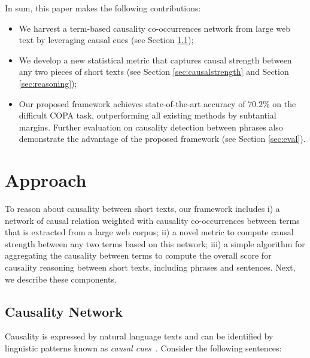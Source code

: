 \documentclass[letterpaper]{article}
\newcommand{\secref}[1]{Section \ref{#1}}
\begin{document}
In sum, this paper makes the following contributions:
\begin{itemize}
\item We harvest a term-based causality co-occurrences network from large
web text by leveraging causal cues (see \secref{sec:network});
\item We develop a new statistical metric that captures causal strength
between any two pieces of short texts (see \secref{sec:causalstrength}
and \secref{sec:reasoning});

\item Our proposed framework achieves state-of-the-art accuracy of $70.2\%$
on the difficult COPA task, outperforming all existing methods by subtantial margins.
Further evaluation on causality detection between phrases also
demonstrate the advantage of the proposed framework (see \secref{sec:eval}).
\end{itemize}

% 
\section{Approach}
\label{sec:approach}

To reason about causality between short texts,
our framework includes i) a network of causal relation weighted with
causality co-occurrences between terms that is extracted from
a large web corpus; ii) a novel metric to compute causal strength
 between any two terms based on this network; iii)
a simple algorithm for aggregating the causality between terms to
compute the overall score for causality reasoning between short texts,
including phrases and sentences.
Next, we describe these components.

\subsection{Causality Network}
\label{sec:network}

Causality is expressed by natural language texts and can be identified by
linguistic patterns known as {\em causal cues}~\cite{ChangC04}.
Consider the following sentences:
\end{document}
